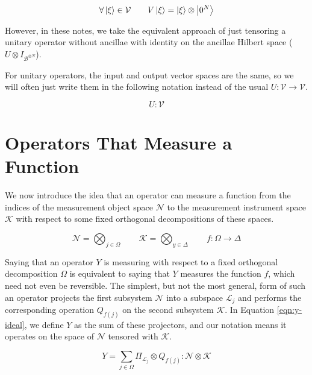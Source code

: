 \begin{equation}
\forall \left\vert{\xi}\right\rangle \in \mathcal{V} \qquad V\left\vert{\xi}\right\rangle = \left\vert{\xi}\right\rangle \otimes \left\vert{0^N}\right\rangle
\end{equation}

However, in these notes, we take the equivalent approach of just
tensoring a unitary operator without ancillae with identity on the
ancillae Hilbert space ($U \otimes I_{\mathcal{B}^{\otimes N}}$).

For unitary operators, the input and output vector spaces are the same,
so we will often just write them in the following notation instead of
the usual $U: \mathcal{V} \rightarrow \mathcal{V}$.

\begin{equation}
U : \mathcal{V}
\end{equation}

\section{Operators That Measure a Function}
\label{sec:meas-func}

We now introduce the idea that an operator can measure a function
from the indices of the measurement object space $\mathcal{N}$
to the measurement instrument space $\mathcal{K}$ with respect to
some fixed orthogonal decompositions of these spaces.

\begin{equation}
\mathcal{N} = \bigotimes_{j \in \Omega} \qquad
\mathcal{K} = \bigotimes_{y \in \Delta} \qquad
f:\Omega \rightarrow \Delta
\end{equation}

Saying that an operator $Y$ is measuring with respect to a fixed
orthogonal decomposition $\Omega$ is equivalent to saying that
$Y$ measures the function $f$, which need not even be reversible.
The simplest, but not the most general, form of such an operator projects
the first subsystem $\mathcal{N}$ into a subspace $\mathcal{L}_j$
and performs the
corresponding operation $Q_{f(j)}$ on the second subsystem $\mathcal{K}$.
In Equation \ref{eqn:y-ideal}, we define $Y$ as the sum of these projectors,
and our notation means it operates on the space of $\mathcal{N}$
tensored with $\mathcal{K}$.

\begin{equation}
Y = \sum_{j \in \Omega} \Pi_{\mathcal{L}_j} \otimes Q_{f(j)} : \mathcal{N} \otimes \mathcal{K}
\label{eqn:y-ideal}
\end{equation}

